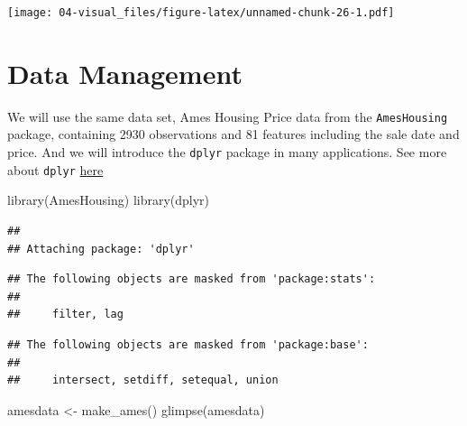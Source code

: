 \documentclass[
]{book}
\newenvironment{Shaded}{\begin{snugshade}}{\end{snugshade}}
\newcommand{\FunctionTok}[1]{\textcolor[rgb]{0.00,0.00,0.00}{#1}}
\newcommand{\NormalTok}[1]{#1}
\newcommand{\OtherTok}[1]{\textcolor[rgb]{0.56,0.35,0.01}{#1}}
\begin{document}
\texttt{[image: 04-visual\_files/figure-latex/unnamed-chunk-26-1.pdf]}

\hypertarget{data-management}{%
\chapter{Data Management}\label{data-management}}

We will use the same data set, Ames Housing Price data from the \texttt{AmesHousing} package, containing 2930 observations and 81 features including the sale date and price. And we will introduce the \texttt{dplyr} package in many applications. See more about \texttt{dplyr} \href{https://dplyr.tidyverse.org/articles/dplyr.html}{here}

\begin{Shaded}
\begin{Highlighting}[]
\FunctionTok{library}\NormalTok{(AmesHousing)}
\FunctionTok{library}\NormalTok{(dplyr)}
\end{Highlighting}
\end{Shaded}

\begin{verbatim}
## 
## Attaching package: 'dplyr'
\end{verbatim}

\begin{verbatim}
## The following objects are masked from 'package:stats':
## 
##     filter, lag
\end{verbatim}

\begin{verbatim}
## The following objects are masked from 'package:base':
## 
##     intersect, setdiff, setequal, union
\end{verbatim}

\begin{Shaded}
\begin{Highlighting}[]
\NormalTok{amesdata }\OtherTok{\textless{}{-}} \FunctionTok{make\_ames}\NormalTok{()}
\FunctionTok{glimpse}\NormalTok{(amesdata)}
\end{Highlighting}
\end{Shaded}
\end{document}
